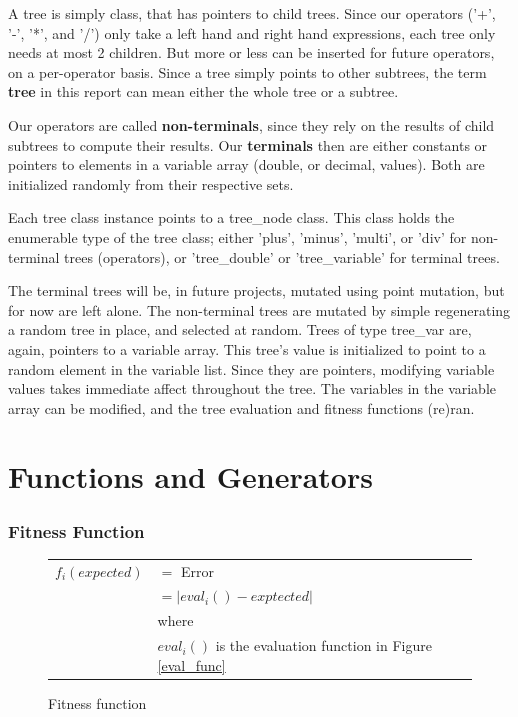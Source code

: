 \documentclass[12pt]{article}
\begin{document}
A tree is simply class, that has pointers to child trees. Since our operators ('+', '-', '*', and '/') only take a left hand and right hand expressions, each tree only needs at most 2 children. But more or less can be inserted for future operators, on a per-operator basis. Since a tree simply points to other subtrees, the term \textbf{tree} in this report can mean either the whole tree or a subtree.

Our operators are called \textbf{non-terminals}, since they rely on the results of child subtrees to compute their results. Our \textbf{terminals} then are either constants or pointers to elements in a variable array (double, or decimal, values). Both are initialized randomly from their respective sets.

Each tree class instance points to a tree\_node class. This class holds the enumerable type of the tree class; either 'plus', 'minus', 'multi', or 'div' for non-terminal trees (operators), or 'tree\_double' or 'tree\_variable' for terminal trees.

The terminal trees will be, in future projects, mutated using point mutation, but for now are left alone. The non-terminal trees are mutated by simple regenerating a random tree in place, and selected at random. Trees of type tree\_var are, again, pointers to a variable array. This tree's value is initialized to point to a random element in the variable list. Since they are pointers, modifying variable values takes immediate affect throughout the tree. The variables in the variable array can be modified, and the tree evaluation and fitness functions (re)ran. 


\part{Functions and Generators}
\section{Fitness Function}
\begin{figure}[!h]
        \begin{center}
		\begin{tabular}{r l}
			$ f_i(expected) $		&	$ = $ Error \\
								&	$ = | eval_i() - exptected | $ \\
								& where \\
								& $ eval_i() $ is the evaluation function in Figure \ref{eval_func}\\
		\end{tabular}
               \caption{Fitness function}
                \label{fit_func}
        \end{center}
\end{figure}
\end{document}
